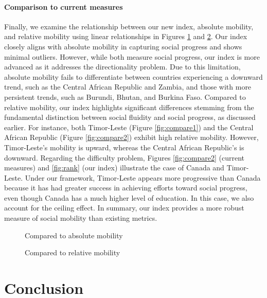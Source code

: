 \paragraph{Comparison to current measures}
Finally, we examine the relationship between our new index, absolute mobility, and relative mobility using linear relationships in Figures \ref{fig:abs_pro} and \ref{fig:rel_pro}. Our index closely aligns with absolute mobility in capturing social progress and shows minimal outliers. However, while both measure social progress, our index is more advanced as it addresses the directionality problem. Due to this limitation, absolute mobility fails to differentiate between countries experiencing a downward trend, such as the Central African Republic and Zambia, and those with more persistent trends, such as Burundi, Bhutan, and Burkina Faso. Compared to relative mobility, our index highlights significant differences stemming from the fundamental distinction between social fluidity and social progress, as discussed earlier. For instance, both Timor-Leste (Figure \ref{fig:compare1}) and the Central African Republic (Figure \ref{fig:compare2}) exhibit high relative mobility. However, Timor-Leste’s mobility is upward, whereas the Central African Republic’s is downward. Regarding the difficulty problem, Figures \ref{fig:compare2} (current measures) and \ref{fig:rank} (our index) illustrate the case of Canada and Timor-Leste. Under our framework, Timor-Leste appears more progressive than Canada because it has had greater success in achieving efforts toward social progress, even though Canada has a much higher level of education. In this case, we also account for the ceiling effect. In summary, our index provides a more robust measure of social mobility than existing metrics.

\begin{figure}[H]
    \centering
    \scalebox{0.5}{}
    \caption{Compared to absolute mobility}
    \label{fig:abs_pro}
\end{figure}

\begin{figure}[H]
    \centering
    \scalebox{0.5}{}
    \caption{Compared to relative mobility}
    \label{fig:rel_pro}
\end{figure}


\section{Conclusion} \label{sec:conclusion}

